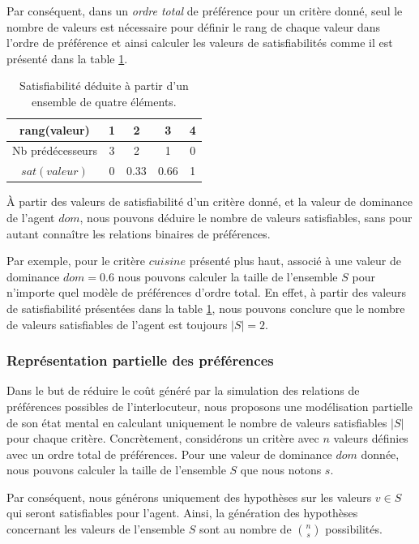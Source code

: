 	Par conséquent, dans un \emph{ordre total} de préférence pour un critère donné, seul le nombre de valeurs est nécessaire pour définir le rang de chaque valeur dans l'ordre de préférence et ainsi calculer les valeurs de satisfiabilités comme il est présenté dans la table \ref{tab:poss}. 


	\begin{table}[h]
		\caption{Satisfiabilité déduite à partir d'un ensemble de quatre éléments.}
		\label{tab:poss}
		\centering
		
		\begin{tabular}{ |c|c|c|c|c| }
			\hline				
			rang(valeur) & 1 & 2 & 3 & 4 \\
			\hline
			Nb prédécesseurs & 3 & 2 & 1& 0 \\
			\hline
			$sat(valeur)$ & 0 & 0.33 & 0.66 &1 \\
			\hline
		\end{tabular}
	\end{table}
	
À partir des valeurs de satisfiabilité d'un critère donné, et la valeur de dominance de l'agent $dom$, nous pouvons déduire le nombre de valeurs satisfiables, sans pour autant connaître les relations binaires de préférences. 

Par exemple, pour le critère $cuisine$ présenté plus haut, associé à une valeur de dominance $dom= 0.6$  nous pouvons calculer la taille de l'ensemble $S$ pour n'importe quel modèle de préférences d'ordre total. En effet, à partir des valeurs de satisfiabilité présentées dans la table \ref{tab:poss},  nous pouvons conclure que le nombre de valeurs satisfiables de l'agent est toujours $|S| = 2$.

\subsubsection{Représentation partielle des préférences}

Dans le but de réduire le coût généré par la simulation des relations de préférences possibles de l'interlocuteur, nous proposons une modélisation partielle de son état mental en calculant uniquement le nombre de valeurs satisfiables $|S|$ pour chaque critère. Concrètement, considérons un critère avec $n$ valeurs définies avec un ordre total de préférences. Pour une valeur de dominance $dom$ donnée, nous pouvons calculer la taille de l'ensemble $S$ que nous notons $s$. 

Par conséquent, nous générons uniquement des hypothèses sur les valeurs $v \in S$ qui seront satisfiables pour l'agent. Ainsi,  la génération des hypothèses concernant les valeurs de l'ensemble $S$ sont au nombre de  $\binom{n}{s}$ possibilités. 


